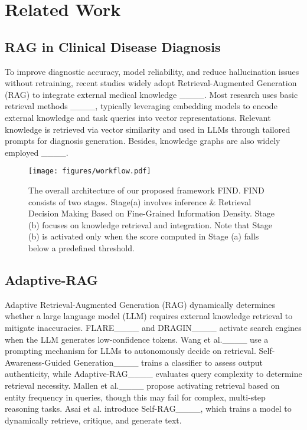 \section{Related Work}
\subsection{RAG in Clinical Disease Diagnosis}
To improve diagnostic accuracy, model reliability, and reduce hallucination issues without retraining, recent studies widely adopt Retrieval-Augmented Generation (RAG) to integrate external medical knowledge ____. Most research uses basic retrieval methods ____, typically leveraging embedding models to encode external knowledge and task queries into vector representations. Relevant knowledge is retrieved via vector similarity and used in LLMs through tailored prompts for diagnosis generation. Besides, knowledge graphs are also widely employed ____. 


\begin{figure*}[t]
	\centering
	\texttt{[image: figures/workflow.pdf]}
	\caption{The overall architecture of our proposed framework FIND. FIND consists of two stages. Stage(a) involves inference \& Retrieval Decision Making Based on Fine-Grained Information Density. Stage (b) focuses on knowledge retrieval and integration. Note that Stage (b) is activated only when the score computed in Stage (a) falls below a predefined threshold.}
	\label{workflow}
\end{figure*}

\subsection{Adaptive-RAG}
Adaptive Retrieval-Augmented Generation (RAG) dynamically determines whether a large language model (LLM) requires external knowledge retrieval to mitigate inaccuracies. FLARE____ and DRAGIN____ activate search engines when the LLM generates low-confidence tokens. Wang et al.____ use a prompting mechanism for LLMs to autonomously decide on retrieval. Self-Awareness-Guided Generation____ trains a classifier to assess output authenticity, while Adaptive-RAG____ evaluates query complexity to determine retrieval necessity. Mallen et al.____ propose activating retrieval based on entity frequency in queries, though this may fail for complex, multi-step reasoning tasks. Asai et al. introduce Self-RAG____, which trains a model to dynamically retrieve, critique, and generate text.

